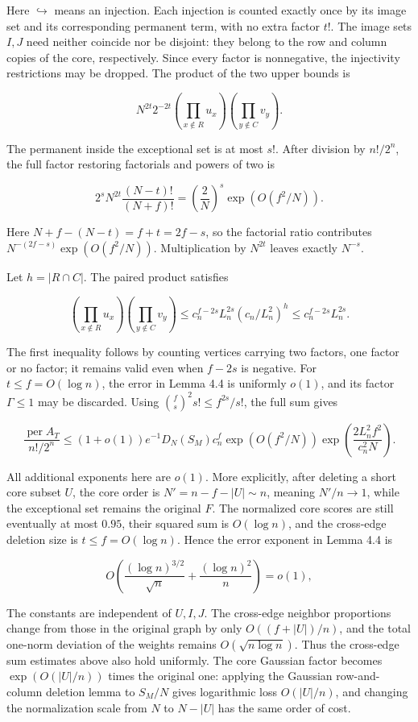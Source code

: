 \documentclass[11pt,a4paper]{article}
\begin{document}
Here \(\hookrightarrow\) means an injection. Each injection is counted exactly once by its image set and its corresponding permanent term, with no extra factor \(t!\). The image sets \(I,J\) need neither coincide nor be disjoint: they belong to the row and column copies of the core, respectively. Since every factor is nonnegative, the injectivity restrictions may be dropped. The product of the two upper bounds is

\[
N^{2t}2^{-2t}
\left(\prod_{x\notin R}u_x\right)
\left(\prod_{y\notin C}v_y\right).
\]

The permanent inside the exceptional set is at most \(s!\). After division by \(n!/2^n\), the full factor restoring factorials and powers of two is

\[
2^sN^{2t}\frac{(N-t)!}{(N+f)!}
=\left(\frac2N\right)^s\exp(O(f^2/N)).
\]

Here \(N+f-(N-t)=f+t=2f-s\), so the factorial ratio contributes \(N^{-(2f-s)}\exp(O(f^2/N))\). Multiplication by \(N^{2t}\) leaves exactly \(N^{-s}\).

Let \(h=|R\cap C|\). The paired product satisfies

\[
\left(\prod_{x\notin R}u_x\right)
\left(\prod_{y\notin C}v_y\right)
\le c_n^{f-2s}L_n^{2s}(c_n/L_n^2)^h
\le c_n^{f-2s}L_n^{2s}.
\]

The first inequality follows by counting vertices carrying two factors, one factor or no factor; it remains valid even when \(f-2s\) is negative. For \(t\le f=O(\log n)\), the error in Lemma 4.4 is uniformly \(o(1)\), and its factor \(\Gamma\le1\) may be discarded. Using \(\binom fs^2s!\le f^{2s}/s!\), the full sum gives

\[
\frac{\operatorname{per}A_T}{n!/2^n}
\le(1+o(1))e^{-1}D_N(S_M)c_n^f
\exp(O(f^2/N))
\exp\left(\frac{2L_n^2f^2}{c_n^2N}\right).
\]

All additional exponents here are \(o(1)\). More explicitly, after deleting a short core subset \(U\), the core order is \(N'=n-f-|U|\sim n\), meaning \(N'/n\to1\), while the exceptional set remains the original \(F\). The normalized core scores are still eventually at most \(0.95\), their squared sum is \(O(\log n)\), and the cross-edge deletion size is \(t\le f=O(\log n)\). Hence the error exponent in Lemma 4.4 is

\[
O\!\left(\frac{(\log n)^{3/2}}{\sqrt n}+\frac{(\log n)^2}{n}\right)=o(1),
\]

The constants are independent of \(U,I,J\). The cross-edge neighbor proportions change from those in the original graph by only \(O((f+|U|)/n)\), and the total one-norm deviation of the weights remains \(O(\sqrt{n\log n})\). Thus the cross-edge sum estimates above also hold uniformly. The core Gaussian factor becomes \(\exp(O(|U|/n))\) times the original one: applying the Gaussian row-and-column deletion lemma to \(S_M/N\) gives logarithmic loss \(O(|U|/n)\), and changing the normalization scale from \(N\) to \(N-|U|\) has the same order of cost.
\end{document}
